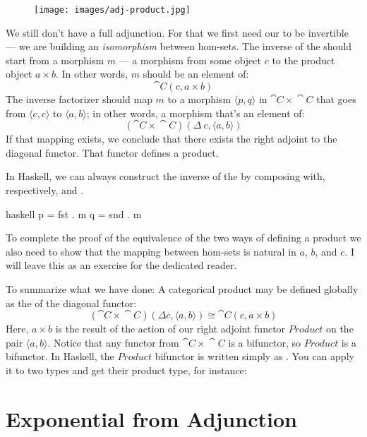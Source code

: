 \begin{figure}[H]
  \centering
  \texttt{[image: images/adj-product.jpg]}
\end{figure}

\noindent
We still don't have a full adjunction. For that we first need our
 to be invertible --- we are building an
\emph{isomorphism} between hom-sets. The inverse of the
 should start from a morphism $m$ --- a
morphism from some object $c$ to the product object $a\times{}b$.
In other words, $m$ should be an element of:
\[\cat{C}(c, a\times{}b)\]
The inverse factorizer should map $m$ to a morphism
$\langle p, q \rangle$ in $\cat{C}\times{}\cat{C}$ that goes from
$\langle c, c \rangle$ to
$\langle a, b \rangle$; in other words, a morphism
that's an element of:
\[(\cat{C}\times{}\cat{C})(\Delta\ c, \langle a, b \rangle)\]
If that mapping exists, we conclude that there exists the right adjoint
to the diagonal functor. That functor defines a product.

In Haskell, we can always construct the inverse of the
 by composing  with, respectively,
 and .

\begin{snip}{haskell}
p = fst . m
q = snd . m
\end{snip}
To complete the proof of the equivalence of the two ways of defining a
product we also need to show that the mapping between hom-sets is
natural in $a$, $b$, and $c$. I will leave this as
an exercise for the dedicated reader.

To summarize what we have done: A categorical product may be defined
globally as the  of the diagonal functor:
\[(\cat{C}\times{}\cat{C})(\Delta c, \langle a, b \rangle) \cong \cat{C}(c, a\times{}b)\]
Here, $a\times{}b$ is the result of the action of our right adjoint
functor $\mathit{Product}$ on the pair
$\langle a, b \rangle$. Notice that any functor from
$\cat{C}\times{}\cat{C}$ is a bifunctor, so $\mathit{Product}$ is a bifunctor. In
Haskell, the $\mathit{Product}$ bifunctor is written simply as
\code{(,)}. You can apply it to two types and get their product type,
for instance:


\section{Exponential from Adjunction}

